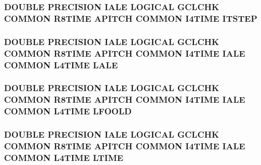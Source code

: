 \hypertarget{time_8com_a786e3f66d928497c6f34694ad75543f4}{
\subsubsection[{I\-T\-S\-T\-E\-P}]{\setlength{\rightskip}{0pt plus 5cm}D\-O\-U\-B\-L\-E P\-R\-E\-C\-I\-S\-I\-O\-N I\-A\-L\-E L\-O\-G\-I\-C\-A\-L G\-C\-L\-C\-H\-K C\-O\-M\-M\-O\-N R8\-T\-I\-M\-E {\bf A\-P\-I\-T\-C\-H} C\-O\-M\-M\-O\-N I4\-T\-I\-M\-E I\-T\-S\-T\-E\-P}}\label{time_8com_a786e3f66d928497c6f34694ad75543f4}
\hypertarget{time_8com_ad4ab8d0cb1447f972537eb518a71c20b}{
\subsubsection[{L\-A\-L\-E}]{\setlength{\rightskip}{0pt plus 5cm}D\-O\-U\-B\-L\-E P\-R\-E\-C\-I\-S\-I\-O\-N I\-A\-L\-E L\-O\-G\-I\-C\-A\-L G\-C\-L\-C\-H\-K C\-O\-M\-M\-O\-N R8\-T\-I\-M\-E {\bf A\-P\-I\-T\-C\-H} C\-O\-M\-M\-O\-N I4\-T\-I\-M\-E I\-A\-L\-E C\-O\-M\-M\-O\-N L4\-T\-I\-M\-E L\-A\-L\-E}}\label{time_8com_ad4ab8d0cb1447f972537eb518a71c20b}
\hypertarget{time_8com_a8f1c291f9e9b0f1c287055044411b18e}{
\subsubsection[{L\-F\-O\-O\-L\-D}]{\setlength{\rightskip}{0pt plus 5cm}D\-O\-U\-B\-L\-E P\-R\-E\-C\-I\-S\-I\-O\-N I\-A\-L\-E L\-O\-G\-I\-C\-A\-L G\-C\-L\-C\-H\-K C\-O\-M\-M\-O\-N R8\-T\-I\-M\-E {\bf A\-P\-I\-T\-C\-H} C\-O\-M\-M\-O\-N I4\-T\-I\-M\-E I\-A\-L\-E C\-O\-M\-M\-O\-N L4\-T\-I\-M\-E L\-F\-O\-O\-L\-D}}\label{time_8com_a8f1c291f9e9b0f1c287055044411b18e}
\hypertarget{time_8com_a5194e009f554c771a956f03d9c6b3acd}{
\subsubsection[{L\-T\-I\-M\-E}]{\setlength{\rightskip}{0pt plus 5cm}D\-O\-U\-B\-L\-E P\-R\-E\-C\-I\-S\-I\-O\-N I\-A\-L\-E L\-O\-G\-I\-C\-A\-L G\-C\-L\-C\-H\-K C\-O\-M\-M\-O\-N R8\-T\-I\-M\-E {\bf A\-P\-I\-T\-C\-H} C\-O\-M\-M\-O\-N I4\-T\-I\-M\-E I\-A\-L\-E C\-O\-M\-M\-O\-N L4\-T\-I\-M\-E L\-T\-I\-M\-E}}\label{time_8com_a5194e009f554c771a956f03d9c6b3acd}
